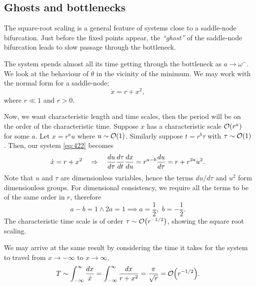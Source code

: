 \documentclass[oneside]{book}
\begin{document}
\subsection{Ghosts and bottlenecks}
The square-root scaling is a general feature of systems close to a saddle-node bifurcation. Just before the fixed points appear, the \textit{``ghost''} of the saddle-node bifurcation leads to slow passage through the bottleneck.
\par
The system spends almost all its time getting through the bottleneck as $ a \to \omega^- $. We look at the behaviour of $ \dot{\theta} $ in the vicinity of the minimum. We may work with the normal form for a saddle-node;
\begin{equation} \label{eq:422}
	\dot{x} = r + x^2,
\end{equation}
where $ r \ll 1 $ and $ r > 0 $. 
\par
Now, we want characteristic length and time scales, then the period will be on the order of the characteristic time. Suppose $ x $ has a characteristic scale $ \order{r^a} $ for some $ a $. Let $ x = r^a u $ where $ u \sim \order{1} $. Similarly suppose $ t = r^b \tau $ with $ \tau \sim \order{1} $. Then, our system \eqref{eq:422} becomes
\[
\dot{x} = r + x^2 \quad \Rightarrow \quad \dv{u}{\tau} \dv{\tau}{t} \dv{x}{u} = r^{a - b} \dv{u}{\tau} = r + r^{2a} u^2.
\]
Note that $ u $ and $ \tau $ are dimensionless variables, hence the terms $ du / d\tau $ and $ u^2 $ form dimensionless groups. For dimensional consistency, we require all the terms to be of the same order in $ r $, therefore
\[
a - b = 1 \wedge 2a = 1 \implies a = \frac{1}{2}, \,\, b = -\frac{1}{2}.
\]
The characteristic time scale is of order $ \tau \sim \order{r^{-1/2}} $, showing the square root scaling.
\par
We may arrive at the same result by considering the time it takes for the system to travel from $ x \to - \infty $ to $ x \to \infty $,
\[
T \sim \infint \frac{dx}{\dot{x}} = \infint \frac{dx}{r + x^2} = \frac{\pi}{\sqrt{r}} = \order{r^{-1/2}}.
\]
\end{document}
